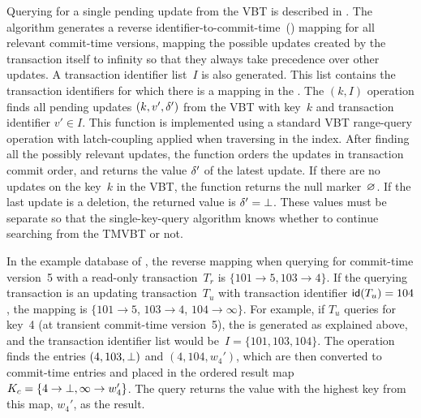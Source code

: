 Querying for a single pending update from the VBT is described in
\@.
The algorithm generates a reverse identifier-to-commit-time~()
mapping for all relevant commit-time versions, mapping the
possible updates created by the transaction itself to infinity so
that they always take precedence over other updates.
A transaction identifier list~$I$ is also generated.
This list contains the transaction identifiers for which there is a mapping
in the \@.
The $(k, I)$ operation finds all pending updates $(k, v',
\delta')$ from the VBT with key~$k$ and transaction identifier $v' \in
I$. 
This function is implemented using a standard VBT range-query operation with
latch-coupling applied when traversing in the index.
After finding all the possibly relevant updates, the 
function orders the updates in transaction commit order, and returns the
value $\delta'$ of the latest update.
If there are no updates on the key~$k$ in the VBT, the function
returns the null marker~$\varnothing$. 
If the last update is a deletion, the returned value is $\delta' = 
\bot$.
These values must be separate so that the single-key-query algorithm
knows whether to continue searching from the TMVBT or not.

In the example database of , the
reverse  mapping when querying for commit-time version~\num{5}
with a read-only transaction~$T_r$ is $\{101 \to 5, 103
\to 4\}$. 
If the querying transaction is an updating transaction~$T_u$ with
transaction identifier $\text{\textsf{id}}(T_u) = 104$, the
 mapping is $\{101 \to 5$, $103 \to 4$,
$104 \to \infty\}$. 
For example, if $T_u$ queries for key~\num{4} (at transient commit-time
version~\num{5}), the  is generated as explained
above, and the transaction identifier list would be~$I = \{101, 103, 104\}$.
The  operation finds the entries $(4, 103, \bot)$
and $(4, 104, w_4')$, which are then converted to commit-time entries
and placed in the ordered result map $K_c = \{4 \to
\bot, \infty \to w_4' \}$.
The query returns the value with the highest key from this map, $w_4'$, as
the result.

